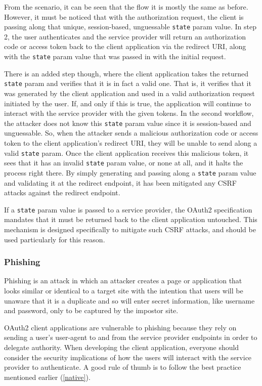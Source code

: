 From the scenario, it can be seen that the flow it is mostly the same as before. However, it must be noticed that with the authorization request, the client is passing along that unique, session-based, unguessable \texttt{state} param value. In step 2, the user authenticates and the service provider will return an authorization code or access token back to the client application via the redirect URI, along with the \texttt{state} param value that was passed in with the initial request.

There is an added step though, where the client application takes the returned \texttt{state} param and verifies that it is in fact a valid one. That is, it verifies that it was generated by the client application and used in a valid authorization request initiated by the user. If, and only if this is true, the application will continue to interact with the service provider with the given tokens.
In the second workflow, the attacker does not know this \texttt{state} param value since it is session-based and unguessable. So, when the attacker sends a malicious authorization code or access token to the client application's redirect URI, they will be unable to send along a valid \texttt{state} param. Once the client application receives this malicious token, it sees that it has an invalid \texttt{state} param value, or none at all, and it halts the process right there. By simply generating and passing along a \texttt{state} param value and validating it at the redirect endpoint, it has been mitigated any CSRF attacks against the redirect endpoint.

If a \texttt{state} param value is passed to a service provider, the OAuth2 specification mandates that it must be returned back to the client application untouched. This mechanism is designed specifically to mitigate such CSRF attacks, and should be used particularly for this reason.

\subsubsection{Phishing}
Phishing is an attack in which an attacker creates a page or application that looks similar or identical to a target site with the intention that users will be unaware that it is a duplicate and so will enter secret information, like username and password, only to be captured by the impostor site.

OAuth2 client applications are vulnerable to phishing because they rely on sending a user's user-agent to and from the service provider endpoints in order to delegate authority. When developing the client application, everyone should consider the security implications of how the users will interact with the service provider to authenticate. A good rule of thumb is to follow the best practice mentioned earlier (\ref{native}).


